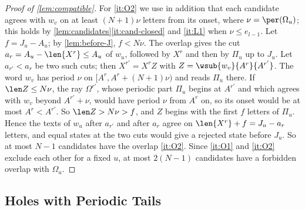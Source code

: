 \begin{proof}[Proof of \cref{lem:compatible}]
For \ref{it:O2} we use in addition that each candidate agrees with $w_v$ on
at least $(N+1)\nu$ letters from its onset, where $\nu=\per(\Omega_u)$; this
holds by \cref{lem:candidates}\eqref{it:cand-closed} and \ref{it:L1} when
$\nu\le e_{l-1}$. Let $f=J_u-A_u$; by \cref{lem:before-J}, $f<N\nu$. The
overlap gives the cut $a_r=A_u-\len{X^r}\le A_u$ of $w_u$, followed by
$X^r$ and then by $\Pi_u$ up to $J_u$. Let $a_{r'}<a_r$ be two such cuts;
then $X^{r'}=X^rZ$ with $Z=\wsub{w_v}{A^r}{A^{r'}}$. The word $w_v$ has
period $\nu$ on $[A^r,A^r+(N+1)\nu)$ and reads $\Pi_u$ there. If
$\len Z\le N\nu$, the ray $\Omega^{r'}$, whose periodic part $\Pi_u$ begins
at $A^{r'}$ and which agrees with $w_v$ beyond $A^{r'}+\nu$, would have
period $\nu$ from $A^r$ on, so its onset would be at most $A^r<A^{r'}$. So
$\len Z>N\nu>f$, and $Z$ begins with the first $f$ letters of $\Pi_u$. Hence
the texts of $w_u$ after $a_{r'}$ and after $a_r$ agree on
$\len{X^r}+f=J_u-a_r$ letters, and equal states at the two cuts would give a
rejected state before $J_u$. So at most $N-1$ candidates have the overlap
\ref{it:O2}. Since \ref{it:O1} and \ref{it:O2} exclude each other for a
fixed $u$, at most $2(N-1)$ candidates have a forbidden overlap with
$\Omega_u$.
\end{proof}

\subsection{Holes with Periodic Tails}\label{app:tails-runcover}

